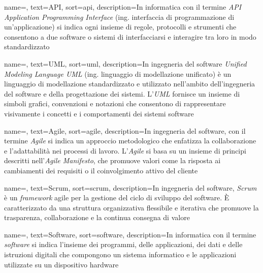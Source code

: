 

 {
    name=,
    text=API,
    sort=api,
    description={In informatica con il termine \emph{API} \emph{Application Programming Interface} (ing. interfaccia di programmazione di un'applicazione) si indica
    ogni insieme di regole, protocolli e strumenti che consentono a due software o sistemi di interfacciarsi e interagire tra loro in modo standardizzato}
}

 {
    name=,
    text=UML,
    sort=uml,
    description={In ingegneria del software \emph{Unified Modeling Language UML} (ing. linguaggio di modellazione unificato) è un linguaggio di 
    modellazione standardizzato e utilizzato nell'ambito dell'ingegneria del software e della progettazione dei sistemi. L'\emph{UML} fornisce un insieme di simboli grafici, convenzioni e notazioni che consentono di rappresentare
    visivamente i concetti e i comportamenti dei sistemi software}
}

 {
    name=,
    text=Agile,
    sort=agile,
    description={In ingegneria del software, con il termine \emph{Agile} si indica un approccio metodologico che enfatizza la collaborazione e l'adattabilità nei processi di lavoro.
    L'\emph{Agile} si basa su un insieme di principi descritti nell'\emph{Agile Manifesto}, che promuove valori come la risposta ai cambiamenti dei requisiti o il coinvolgimento attivo del cliente}
}

 {
    name=,
    text=Scrum,
    sort=scrum,
    description={In ingegneria del software, \emph{Scrum} è un \emph{framework} agile per la gestione del ciclo di sviluppo del software.  È caratterizzato da una struttura organizzativa flessibile e iterativa che promuove la trasparenza, collaborazione e la continua consegna di valore}
}

 {
    name=,
    text=Software,
    sort=software,
    description={In informatica con il termine \emph{software} si indica l'insieme dei programmi, delle applicazioni, dei dati e delle istruzioni digitali che compongono un sistema informatico e le applicazioni utilizzate su un dispositivo hardware}
}

